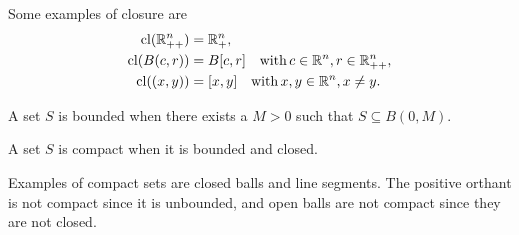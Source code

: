 \documentclass[10pt,a4paper]{article}
\begin{document}
\begin{example}
	Some examples of closure are 
	\begin{equation*}
		\begin{split}
			\mathord{\mathrm{cl}}(\mathbb{R}^n_{++}) &= \mathbb{R}^n_+,\\
			\mathord{\mathrm{cl}}(B(c,r)) &= B[c,r] \quad \mathord{\mathrm{with }}\, c \in \mathbb{R}^n, r \in \mathbb{R}^n_{++},\\
			\mathord{\mathrm{cl}}((x,y)) &= [x,y]\quad \mathord{\mathrm{with }}\, x,y \in \mathbb{R}^n, x\neq y.
		\end{split}
	\end{equation*}
\end{example}
\begin{definition}[Boundedness]
	A set $S$ is bounded when there exists a $M>0$ such that $S\subseteq B(0,M)$.
\end{definition}
\begin{definition}[Compactness]
	A set $S$ is compact when it is bounded and closed.
\end{definition}
Examples of compact sets are closed balls and line segments. The positive orthant is not compact since it is unbounded, and open balls are not compact since they are not closed.
\end{document}
